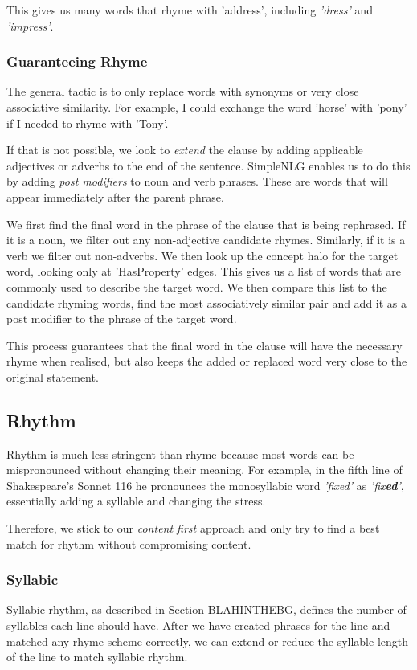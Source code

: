 
This gives us many words that rhyme with 'address', including \textit{'dress'} and \textit{'impress'}.

\subsubsection{Guaranteeing Rhyme}

The general tactic is to only replace words with synonyms or very close associative similarity. For example, I could exchange the word 'horse' with 'pony' if I needed to rhyme with 'Tony'. 

If that is not possible, we look to \textit{extend} the clause by adding applicable adjectives or adverbs to the end of the sentence. SimpleNLG enables us to do this by adding \textit{post modifiers} to noun and verb phrases. These are words that will appear immediately after the parent phrase.

We first find the final word in the phrase of the clause that is being rephrased. If it is a noun, we filter out any non-adjective candidate rhymes. Similarly, if it is a verb we filter out non-adverbs. We then look up the concept halo for the target word, looking only at 'HasProperty' edges. This gives us a list of words that are commonly used to describe the target word. We then compare this list to the candidate rhyming words, find the most associatively similar pair and add it as a post modifier to the phrase of the target word.

This process guarantees that the final word in the clause will have the necessary rhyme when realised, but also keeps the added or replaced word very close to the original statement.


\subsection{Rhythm}
Rhythm is much less stringent than rhyme because most words can be mispronounced without changing their meaning. For example, in the fifth line of Shakespeare's Sonnet 116 he pronounces the monosyllabic word \textit{'fixed'} as \textit{'fix\textbf{ed}'}, essentially adding a syllable and changing the stress.

Therefore, we stick to our \textit{content first} approach and only try to find a best match for rhythm without compromising content. 

\subsubsection{Syllabic}
Syllabic rhythm, as described in Section BLAHINTHEBG, defines the number of syllables each line should have. After we have created phrases for the line and matched any rhyme scheme correctly, we can extend or reduce the syllable length of the line to match syllabic rhythm.

